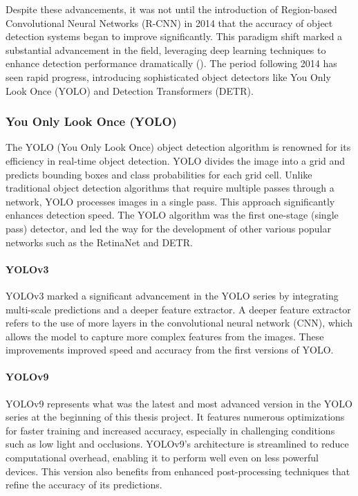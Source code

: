 Despite these advancements, it was not until the introduction of Region-based Convolutional Neural Networks (R-CNN) in 2014 that the accuracy of object detection systems began to improve significantly. This paradigm shift marked a substantial advancement in the field, leveraging deep learning techniques to enhance detection performance dramatically (\cite{zou2023object_detection_in_20_years}). The period following 2014 has seen rapid progress, introducing sophisticated object detectors like You Only Look Once (YOLO) and Detection Transformers (DETR). 

\newpage
\subsubsection{You Only Look Once (YOLO)}
\label{sec:yolo}
The YOLO (You Only Look Once) object detection algorithm is renowned for its efficiency in real-time object detection. YOLO divides the image into a grid and predicts bounding boxes and class probabilities for each grid cell. Unlike traditional object detection algorithms that require multiple passes through a network, YOLO processes images in a single pass. This approach significantly enhances detection speed. The YOLO algorithm was the first one-stage (single pass) detector, and led the way for the development of other various popular networks such as the RetinaNet and DETR.

\paragraph{YOLOv3}
YOLOv3 marked a significant advancement in the YOLO series by integrating multi-scale predictions and a deeper feature extractor. A deeper feature extractor refers to the use of more layers in the convolutional neural network (CNN), which allows the model to capture more complex features from the images. These improvements improved speed and accuracy from the first versions of YOLO.  

\paragraph{YOLOv9}
YOLOv9 represents what was the latest and most advanced version in the YOLO series at the beginning of this thesis project. It features numerous optimizations for faster training and increased accuracy, especially in challenging conditions such as low light and occlusions. YOLOv9's architecture is streamlined to reduce computational overhead, enabling it to perform well even on less powerful devices. This version also benefits from enhanced post-processing techniques that refine the accuracy of its predictions.

